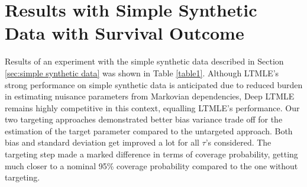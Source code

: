 \documentclass{article}
\theoremstyle{plain}
\theoremstyle{definition}
\theoremstyle{remark}
\begin{document}

\section{Results with Simple Synthetic Data with Survival Outcome}

\label{sec: results with simple synthetic survival data}

Results of an experiment with the simple synthetic data described in Section \ref{sec:simple synthetic data} was shown in Table \ref{table1}. Although LTMLE's strong performance on simple synthetic data is anticipated due to reduced burden in estimating nuisance parameters from Markovian dependencies, Deep LTMLE remains highly competitive in this context, equalling LTMLE's performance. Our two targeting approaches demonstrated better bias variance trade off for the estimation of the target parameter compared to the untargeted approach. Both bias and standard deviation get improved a lot for all $\tau$'s considered. The targeting step made a marked difference in terms of coverage probability, getting much closer to a nominal 95\% coverage probability compared to the one without targeting.
\end{document}
